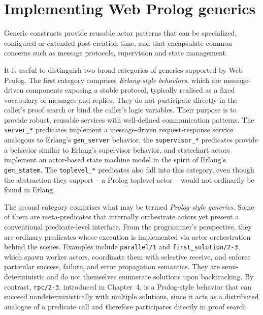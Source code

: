 \chapter{Implementing Web Prolog generics}\label{sec:implementing-prolog-generics}

Generic constructs provide reusable actor patterns that can be specialized,  configured or extended post creation-time, and that encapsulate common concerns such as message protocols, supervision and state management. %

It is useful to distinguish two broad categories of generics supported by Web Prolog. The first category comprises \emph{Erlang-style behaviors}, which are message-driven components exposing a stable protocol, typically realised as a fixed vocabulary of messages and replies. They do not participate directly in the caller's proof search or bind the caller's logic variables. Their purpose is to provide robust, reusable services with well-defined communication patterns. The  \texttt{server\_*} predicates implement a message-driven request-response service analogous to Erlang's \texttt{gen\_server} behavior, the \texttt{supervisor\_*} predicates provide a behavior similar to Erlang's supervisor behavior, and statechart actors implement an actor-based state machine model in the spirit of Erlang's \texttt{gen\_statem}. The \texttt{toplevel\_*} predicates also fall into this category, even though the abstraction they support -- a Prolog toplevel actor -- would not ordinarily be found in Erlang.

The second category comprises what may be termed \emph{Prolog-style generics}. Some of them are meta-predicates that internally orchestrate actors yet present a conventional predicate-level interface. From the programmer's perspective, they are ordinary predicates whose execution is implemented via actor orchestration behind the scenes. Examples include \texttt{parallel/1} and \texttt{first\_solution/2-3}, which spawn worker actors, coordinate them with selective receive, and enforce particular success, failure, and error propagation semantics. They are semi-deterministic and do not themselves enumerate solutions upon backtracking. By contrast, \texttt{rpc/2-3}, introduced in Chapter~4, is a Prolog-style behavior that can succeed nondeterministically with multiple solutions, since it acts as a distributed analogue of a predicate call and therefore participates directly in proof search.

